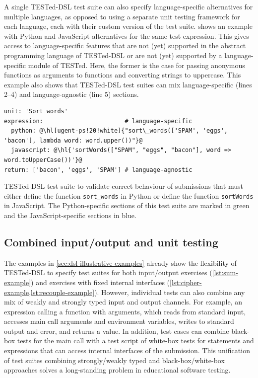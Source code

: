 \documentclass[../main]{subfiles}
\begin{document}
A single TESTed-DSL test suite can also specify language-specific alternatives for multiple languages, as opposed to using a separate unit testing framework for each language, each with their custom version of the test suite.
 shows an example with Python and JavaScript alternatives for the same test expression.
This gives access to language-specific features that are not (yet) supported in the abstract programming language of TESTed-DSL or are not (yet) supported by a language-specific module of TESTed.
Here, the former is the case for passing anonymous functions as arguments to functions and converting strings to uppercase.
This example also shows that TESTed-DSL test suites can mix language-specific (lines 2--4) and language-agnostic (line 5) sections.

\begin{listing}
    \begin{verbatim}
unit: 'Sort words'
expression:                       # language-specific
  python: @\hl[ugent-ps!20!white]{"sort\_words(['SPAM', 'eggs', 'bacon'], lambda word: word.upper())"}@
  javascript: @\hl{'sortWords(["SPAM", "eggs", "bacon"], word => word.toUpperCase())'}@
return: ['bacon', 'eggs', 'SPAM'] # language-agnostic
    \end{verbatim}
    \caption[]{
        TESTed-DSL test suite to validate correct behaviour of submissions that must either define the function \texttt{sort\_words} in Python or define the function \texttt{sortWords} in JavaScript. The Python-specific sections of this test suite are marked in green and the JavaScript-specific sections in blue.
    }
    \label{lst:multiple-test-suite}
\end{listing}

\subsection{Combined input/output and unit testing}\label{subsec:combined-i/o-stream-and-unit-testing}

The examples in \cref{sec:dsl-illustrative-examples} already show the flexibility of TESTed-DSL to specify test suites for both input/output exercises (\cref{lst:sum-example}) and exercises with fixed internal interfaces (\cref{lst:cipher-example,lst:recouple-example}).
However, individual tests can also combine any mix of weakly and strongly typed input and output channels.
For example, an expression calling a function with arguments, which reads from standard input, accesses main call arguments and environment variables, writes to standard output and error, and returns a value.
In addition, test cases can combine black-box tests for the main call with a test script of white-box tests for statements and expressions that can access internal interfaces of the submission.
This unification of test suites combining strongly/weakly typed and black-box/white-box approaches solves a long-standing problem in educational software testing.
\end{document}
